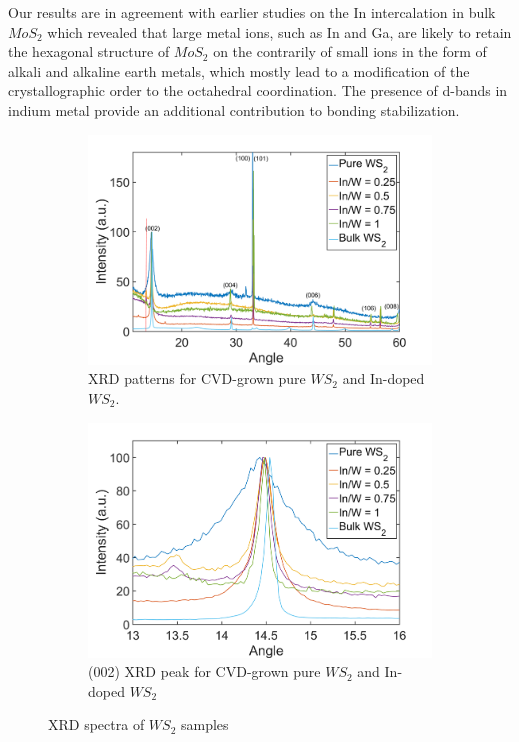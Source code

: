 Our results are in agreement with earlier studies on the In intercalation in bulk $MoS_2$ which revealed that large metal ions, such as In and Ga, are likely to retain the hexagonal structure of $MoS_2$ on the contrarily of small ions in the form of alkali and alkaline earth metals, which mostly lead to a modification of the crystallographic order \cite{Somoano1979} to the octahedral coordination. The presence of d-bands in indium metal provide an additional contribution to bonding stabilization.
 

\begin{figure}[!h]
	\begin{center}
		\begin{subfigure}[b]{1\textwidth}
			\includegraphics[scale=0.35]{In/XRDAll.png}
			\caption{XRD patterns for CVD-grown pure $WS_2$ and In-doped $WS_2$.}
			\label{fig:InXRDAll}
		\end{subfigure}
		\qquad
		\begin{subfigure}[b]{1\textwidth}
			\includegraphics[scale=0.35]{In/XRDIn.png}
			\caption{(002) XRD peak for CVD-grown pure $WS_2$ and In-doped $WS_2$}
			\label{fig:InXRDIn}
		\end{subfigure}
		\caption{XRD spectra of $WS_2$ samples}
		\label{fig:InXRDSpectra}
	\end{center}
\end{figure}

